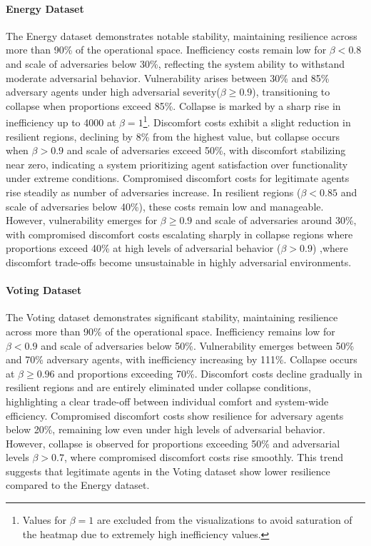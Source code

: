 \documentclass[journal]{IEEEtran}
\begin{document}
\paragraph{Energy Dataset}
The Energy dataset demonstrates notable stability, maintaining resilience across more than 90\% of the operational space. Inefficiency costs remain low for $\beta < 0.8$ and scale of adversaries below 30\%, reflecting the system ability to withstand moderate adversarial behavior. Vulnerability arises between 30\% and 85\% adversary agents under high adversarial severity($\beta \geq 0.9$), transitioning to collapse when proportions exceed 85\%. Collapse is marked by a sharp rise in inefficiency up to 4000 at $\beta = 1$\footnote{Values for $\beta=1$ are excluded from the visualizations to avoid saturation of the heatmap due to extremely high inefficiency values.}.
Discomfort costs exhibit a slight reduction in resilient regions, declining by 8\% from the highest value, but collapse occurs when $\beta > 0.9$ and scale of adversaries exceed 50\%, with discomfort stabilizing near zero, indicating a system prioritizing agent satisfaction over functionality under extreme conditions.
Compromised discomfort costs for legitimate agents rise steadily as number of adversaries increase. In resilient regions ($\beta < 0.85$ and scale of adversaries below 40\%), these costs remain low and manageable. However, vulnerability emerges for $\beta \geq 0.9$ and scale of adversaries around 30\%, with compromised discomfort costs escalating sharply in collapse regions where proportions exceed 40\% at high levels of adversarial behavior ($\beta > 0.9$) ,where discomfort trade-offs become unsustainable in highly adversarial environments.

\paragraph{Voting Dataset}
The Voting dataset demonstrates significant stability, maintaining resilience across more than 90\% of the operational space. Inefficiency remains low for $\beta < 0.9$ and scale of adversaries below 50\%. Vulnerability emerges between 50\% and 70\% adversary agents, with inefficiency increasing by 111\%. Collapse occurs at $\beta \geq 0.96$ and proportions exceeding 70\%. Discomfort costs decline gradually in resilient regions and are entirely eliminated under collapse conditions, highlighting a clear trade-off between individual comfort and system-wide efficiency. Compromised discomfort costs show resilience for adversary agents below 20\%, remaining low even under high levels of adversarial behavior. However, collapse is observed for proportions exceeding 50\% and adversarial levels $\beta > 0.7$, where compromised discomfort costs rise smoothly. This trend suggests that legitimate agents in the Voting dataset show lower resilience compared to the Energy dataset.
\end{document}
